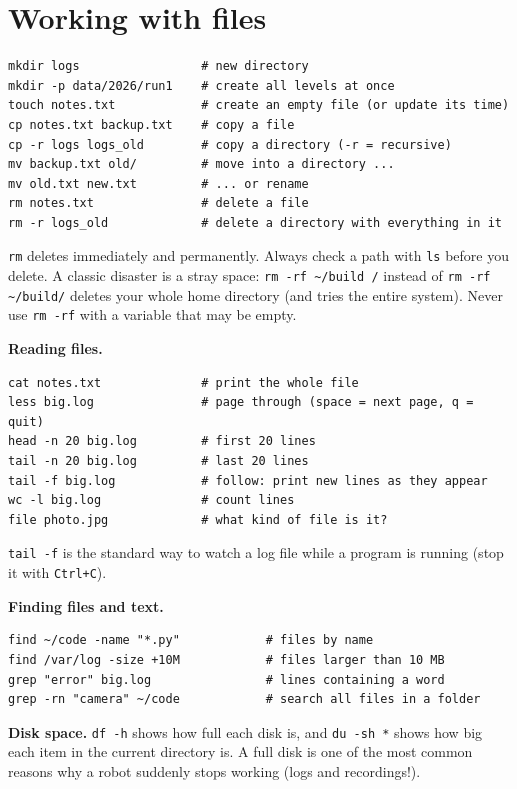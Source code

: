 \section*{Working with files}
\begin{verbatim}
mkdir logs                 # new directory
mkdir -p data/2026/run1    # create all levels at once
touch notes.txt            # create an empty file (or update its time)
cp notes.txt backup.txt    # copy a file
cp -r logs logs_old        # copy a directory (-r = recursive)
mv backup.txt old/         # move into a directory ...
mv old.txt new.txt         # ... or rename
rm notes.txt               # delete a file
rm -r logs_old             # delete a directory with everything in it
\end{verbatim}
\begin{keyidea}
\texttt{rm} deletes immediately and permanently. Always check a path with \texttt{ls} before you delete. A classic disaster is a stray space: \verb|rm -rf ~/build /| instead of \verb|rm -rf ~/build/| deletes your whole home directory (and tries the entire system). Never use \texttt{rm -rf} with a variable that may be empty.
\end{keyidea}

\textbf{Reading files.}
\begin{verbatim}
cat notes.txt              # print the whole file
less big.log               # page through (space = next page, q = quit)
head -n 20 big.log         # first 20 lines
tail -n 20 big.log         # last 20 lines
tail -f big.log            # follow: print new lines as they appear
wc -l big.log              # count lines
file photo.jpg             # what kind of file is it?
\end{verbatim}
\texttt{tail -f} is the standard way to watch a log file while a program is running (stop it with \texttt{Ctrl+C}).

\textbf{Finding files and text.}
\begin{verbatim}
find ~/code -name "*.py"            # files by name
find /var/log -size +10M            # files larger than 10 MB
grep "error" big.log                # lines containing a word
grep -rn "camera" ~/code            # search all files in a folder
\end{verbatim}
\textbf{Disk space.} \verb|df -h| shows how full each disk is, and \verb|du -sh *| shows how big each item in the current directory is. A full disk is one of the most common reasons why a robot suddenly stops working (logs and recordings!).

